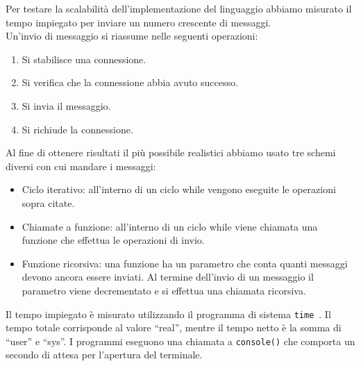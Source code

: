 \documentclass[]{article}
\begin{document}
Per testare la scalabilità dell'implementazione del linguaggio abbiamo misurato il tempo impiegato per inviare un numero crescente di messaggi.\\
Un'invio di messaggio si riassume nelle seguenti operazioni:
\begin{enumerate}
	\item Si stabilisce una connessione.
	\item{Si verifica che la connessione abbia avuto successo.}
	\item Si invia il messaggio. 
	\item Si richiude la connessione.
\end{enumerate}

Al fine di ottenere risultati il più possibile realistici abbiamo usato tre schemi diversi con cui mandare i messaggi:
\begin{itemize}
	\item Ciclo iterativo: all'interno di un ciclo while vengono eseguite le operazioni sopra citate.
	\item Chiamate a funzione: all'interno di un ciclo while viene chiamata una funzione che effettua le operazioni di invio.
	\item Funzione ricorsiva: una funzione ha un parametro che conta quanti messaggi devono ancora essere inviati. Al termine dell'invio di un messaggio il parametro viene decrementato e si effettua una chiamata ricorsiva.
\end{itemize}

Il tempo impiegato è misurato utilizzando il programma di sistema \texttt{time}~\cite{time1linux}. Il tempo totale corrisponde al valore ``real'', mentre il tempo netto è la somma di ``user'' e ``sys''. I programmi eseguono una chiamata a \texttt{console()} che comporta un secondo di attesa per l'apertura del terminale.
\end{document}
